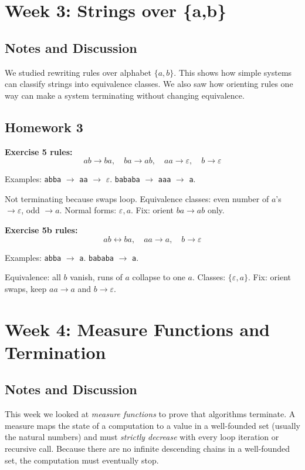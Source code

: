 \documentclass{article}
\theoremstyle{theorem}
\theoremstyle{definition}
\theoremstyle{remark}
\begin{document}
\section{Week 3: Strings over \{a,b\}}

\subsection{Notes and Discussion}
We studied rewriting rules over alphabet $\{a,b\}$. 
This shows how simple systems can classify strings into equivalence classes. 
We also saw how orienting rules one way can make a system terminating without changing equivalence.

\subsection{Homework 3}
\textbf{Exercise 5 rules:}
\[
ab \to ba,\quad ba \to ab,\quad aa \to \varepsilon,\quad b \to \varepsilon
\]

Examples: \texttt{abba} $\to$ \texttt{aa} $\to$ $\varepsilon$.  
\texttt{bababa} $\to$ \texttt{aaa} $\to$ \texttt{a}.  

Not terminating because swaps loop.  
Equivalence classes: even number of $a$’s $\to \varepsilon$, odd $\to a$.  
Normal forms: $\varepsilon, a$.  
Fix: orient $ba \to ab$ only.  

\textbf{Exercise 5b rules:}
\[
ab \leftrightarrow ba,\quad aa \to a,\quad b \to \varepsilon
\]

Examples: \texttt{abba} $\to$ \texttt{a}. \texttt{bababa} $\to$ \texttt{a}.  

Equivalence: all $b$ vanish, runs of $a$ collapse to one $a$.  
Classes: $\{\varepsilon,a\}$.  
Fix: orient swaps, keep $aa \to a$ and $b \to \varepsilon$.  

\section{Week 4: Measure Functions and Termination}

\subsection{Notes and Discussion}
This week we looked at \emph{measure functions} to prove that algorithms terminate.
A measure maps the state of a computation to a value in a well-founded set (usually the natural numbers) and must
\emph{strictly decrease} with every loop iteration or recursive call. Because there are no infinite descending chains in a well-founded set, the computation must eventually stop.
\end{document}
